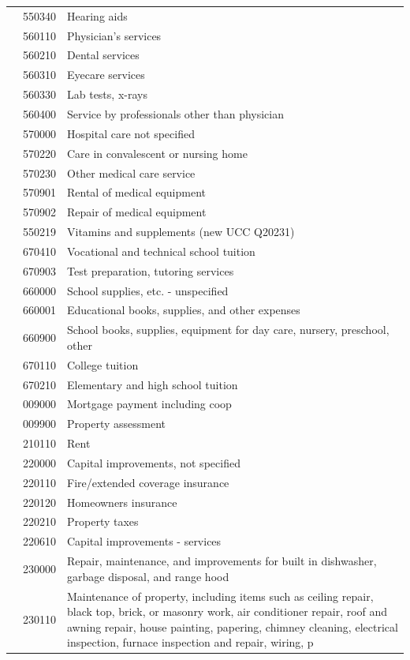 \documentclass[
]{agujournal2019}
\begin{document}
\begin{table}
{\begin{tabular*}{\linewidth}{@{\extracolsep{\fill}}l|rl}
 & 550340 & Hearing aids \\ 
 & 560110 & Physician's services \\ 
 & 560210 & Dental services \\ 
 & 560310 & Eyecare services \\ 
 & 560330 & Lab tests, x-rays \\ 
 & 560400 & Service by professionals other than physician \\ 
 & 570000 & Hospital care not specified \\ 
 & 570220 & Care in convalescent or nursing home \\ 
 & 570230 & Other medical care service \\ 
 & 570901 & Rental of medical equipment \\ 
 & 570902 & Repair of medical equipment \\ 
 & 550219 & Vitamins and supplements (new UCC Q20231) \\ 
\midrule\addlinespace[2.5pt]
\multirow[t]{7}{*}{School} & 670410 & Vocational and technical school tuition \\ 
 & 670903 & Test preparation, tutoring services \\ 
 & 660000 & School supplies, etc. - unspecified \\ 
 & 660001 & Educational books, supplies, and other expenses \\ 
 & 660900 & School books, supplies, equipment for day care, nursery, preschool, other \\ 
 & 670110 & College tuition \\ 
 & 670210 & Elementary and high school tuition \\ 
\midrule\addlinespace[2.5pt]
\multirow[t]{95}{*}{House Related} & 009000 & Mortgage payment including coop \\ 
 & 009900 & Property assessment \\ 
 & 210110 & Rent \\ 
 & 220000 & Capital improvements, not specified \\ 
 & 220110 & Fire/extended coverage insurance \\ 
 & 220120 & Homeowners insurance \\ 
 & 220210 & Property taxes \\ 
 & 220610 & Capital improvements - services \\ 
 & 230000 & Repair, maintenance, and improvements for built in dishwasher, garbage disposal, and range hood \\ 
 & 230110 & Maintenance of property, including items such as ceiling repair, black top, brick, or masonry work, air conditioner repair, roof and awning repair, house painting, papering, chimney cleaning, electrical inspection, furnace inspection and repair, wiring, p \\ 

\end{tabular*}}
\end{table}
\end{document}
